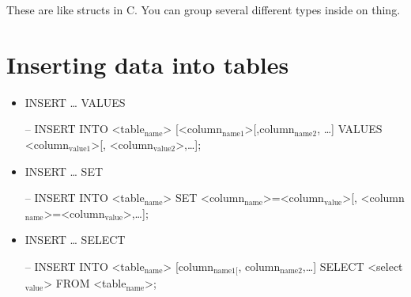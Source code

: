 \documentclass[11pt]{article}
\begin{document}
These are like structs in C.  You can group several different types inside on thing.

\section{Inserting data into tables}
\label{sec-2}

\begin{itemize}
\item INSERT \ldots{}  VALUES

-- INSERT INTO  <table$_{\text{name}}$>  [<column$_{\text{name1}}$>[,column$_{\text{name2}}$, \ldots{}]  VALUES  <column$_{\text{value1}}$>[, <column$_{\text{value2}}$>,\ldots{}];

\item INSERT \ldots{}  SET

-- INSERT INTO <table$_{\text{name}}$>
   SET <column$_{\text{name}}$>=<column$_{\text{value}}$>[, <column$_{\text{name}}$>=<column$_{\text{value}}$>,\ldots{}];

\item INSERT \ldots{}  SELECT

-- INSERT INTO <table$_{\text{name}}$> [column$_{\text{name1[}}$, column$_{\text{name2}}$,\ldots{}]
   SELECT <select$_{\text{value}}$> FROM <table$_{\text{name}}$>;
\end{itemize}
\end{document}
